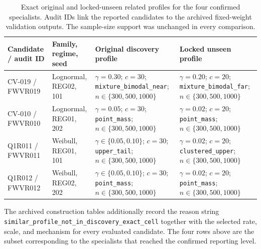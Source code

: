 \begin{table}[htbp]
\centering
\caption{Exact original and locked-unseen related profiles for the four confirmed specialists. Audit IDs link the reported candidates to the archived fixed-weight validation outputs. The sample-size support was unchanged in every comparison.}
\label{tab:locked_unseen_profiles}
\scriptsize
\begin{tabular}{@{}P{0.14\textwidth}P{0.18\textwidth}P{0.30\textwidth}P{0.30\textwidth}@{}}
\toprule
\textbf{Candidate / audit ID} &
\textbf{Family, regime, seed} &
\textbf{Original discovery profile} &
\textbf{Locked unseen profile} \\
\midrule
CV-019 / FWVR019 &
Lognormal, REG02, 101 &
$\gamma=0.30$; $c=30$; \texttt{mixture\_bimodal\_near}; $n\in\{300,500,1000\}$ &
$\gamma=0.20$; $c=20$; \texttt{mixture\_bimodal\_far}; $n\in\{300,500,1000\}$ \\
\addlinespace
CV-010 / FWVR010 &
Lognormal, REG01, 202 &
$\gamma=0.05$; $c=30$; \texttt{point\_mass}; $n\in\{300,500,1000\}$ &
$\gamma=0.02$; $c=20$; \texttt{point\_mass}; $n\in\{300,500,1000\}$ \\
\addlinespace
Q1R011 / FWVR011 &
Weibull, REG01, 101 &
$\gamma\in\{0.05,0.10\}$; $c=30$; \texttt{upper\_tail}; $n\in\{300,500,1000\}$ &
$\gamma=0.02$; $c=20$; \texttt{clustered\_upper}; $n\in\{300,500,1000\}$ \\
\addlinespace
Q1R012 / FWVR012 &
Weibull, REG02, 202 &
$\gamma\in\{0.05,0.10\}$; $c=30$; \texttt{point\_mass}; $n\in\{300,500,1000\}$ &
$\gamma=0.02$; $c=20$; \texttt{point\_mass}; $n\in\{300,500,1000\}$ \\
\bottomrule
\end{tabular}
\end{table}

The archived construction tables additionally record the reason string
\texttt{similar\_profile\_not\_in\_discovery\_exact\_cell} together with the selected rate, scale, and mechanism for every evaluated candidate. The four rows above are the subset corresponding to the specialists that reached the confirmed reporting level.

\clearpage

